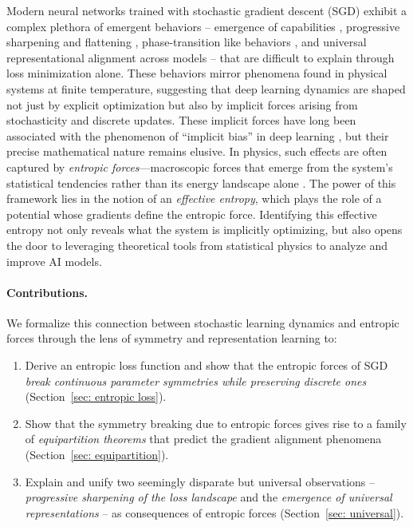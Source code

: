 \documentclass{article}
\theoremstyle{plain}
\begin{document}
Modern neural networks trained with stochastic gradient descent (SGD) exhibit a complex plethora of emergent behaviors -- emergence of capabilities \cite{wei2022emergent,michaud2023quantization,arora2023theory}, progressive sharpening and flattening \cite{cohen2021gradient, cohen2024understanding}, phase-transition like behaviors \cite{ziyin2023zeroth, ziyin2024symmetry}, and universal representational alignment across models \cite{huh2024platonic,yu2024representation,tjandrasuwita2025understanding,shu2025large} -- that are difficult to explain through loss minimization alone. These behaviors mirror phenomena found in physical systems at finite temperature, suggesting that deep learning dynamics are shaped not just by explicit optimization but also by implicit forces arising from stochasticity and discrete updates. These implicit forces have long been associated with the phenomenon of ``implicit bias'' in deep learning \cite{arora2019implicit, galanti2022sgd, damian2022self,xie2024implicit}, but their precise mathematical nature remains elusive. In physics, such effects are often captured by \textit{entropic forces}—macroscopic forces that emerge from the system’s statistical tendencies rather than its energy landscape alone \cite{cai2010friedmann}. The power of this framework lies in the notion of an \textit{effective entropy}, which plays the role of a potential whose gradients define the entropic force. Identifying this effective entropy not only reveals what the system is implicitly optimizing, but also opens the door to leveraging theoretical tools from statistical physics to analyze and improve AI models.

\paragraph{Contributions.} We formalize this connection between stochastic learning dynamics and entropic forces through the lens of symmetry and representation learning to:
\begin{enumerate}[noitemsep,topsep=0pt, parsep=0pt,partopsep=0pt, leftmargin=15pt]
    \item Derive an entropic loss function and show that the entropic forces of SGD \textit{break continuous parameter symmetries while preserving discrete ones} (Section~\ref{sec: entropic loss}).
    \item Show that the symmetry breaking due to entropic forces gives rise to a family of \textit{equipartition theorems} that predict the gradient alignment phenomena (Section~\ref{sec: equipartition}).
    \item Explain and unify two seemingly disparate but universal observations -- \textit{progressive sharpening of the loss landscape} and the \textit{emergence of universal representations} -- as consequences of entropic forces (Section~\ref{sec: universal}).
\end{enumerate}
\end{document}
